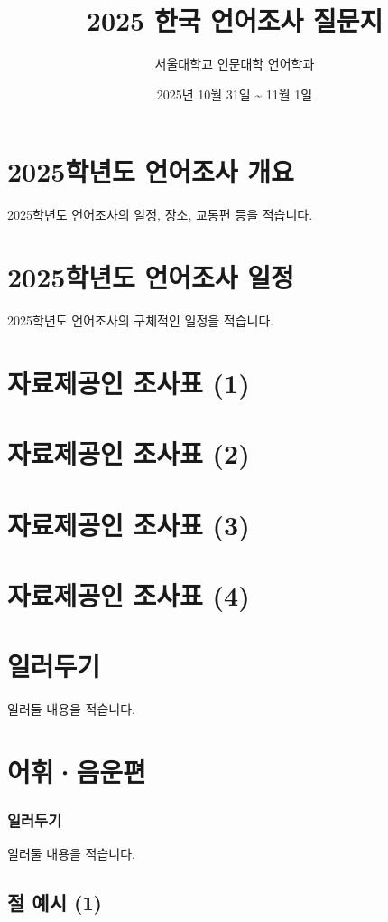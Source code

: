 \documentclass{snu-fl-questionnaire}
\title{2025 한국 언어조사 질문지}
\author{서울대학교 인문대학 언어학과}
\date{2025년 10월 31일 \textasciitilde{} 11월 1일}
\begin{document}
\frontmatter
\maketitle
\tableofcontents

\chapter{2025학년도 언어조사 개요}
2025학년도 언어조사의 일정, 장소, 교통편 등을 적습니다.

\chapter{2025학년도 언어조사 일정}
2025학년도 언어조사의 구체적인 일정을 적습니다.

\chapter{자료제공인 조사표 (1)}
\Consultant

\chapter{자료제공인 조사표 (2)}
\Consultant

\chapter{자료제공인 조사표 (3)}
\Consultant

\chapter{자료제공인 조사표 (4)}
\Consultant

\chapter{일러두기}
일러둘 내용을 적습니다.


\mainmatter
\chapter{어휘·음운편}
\subsection{일러두기}
일러둘 내용을 적습니다.

\section{절 예시 (1)}
\end{document}
